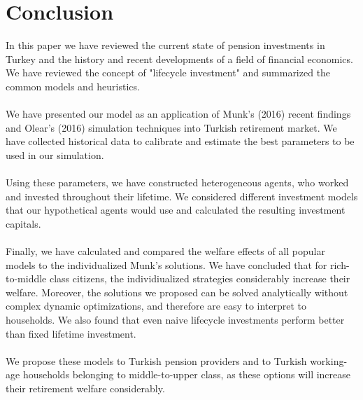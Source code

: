 \documentclass[]{article}
\begin{document}
\begin{table}
\begin{tabular}[c]{lrrrr}
		\hline
	\end{tabular}
\end{table}
\resetgeometry




\section{Conclusion}
\label{conclusion}

In this paper we have reviewed the current state of pension investments in Turkey and the history and recent developments of a field of financial economics. We have reviewed the concept of "lifecycle investment" and summarized the common models and heuristics.

\paragraph{}We have presented our model as an application of Munk's (2016) recent findings and Olear's (2016) simulation techniques into Turkish retirement market. We have collected historical data to calibrate and estimate the best parameters to be used in our simulation.

\paragraph{}Using these parameters, we have constructed heterogeneous agents, who worked and invested throughout their lifetime. We considered different investment models that our hypothetical agents would use and calculated the resulting investment capitals.

\paragraph{}Finally, we have calculated and compared the welfare effects of all popular models to the individualized Munk's solutions. We have concluded that for rich-to-middle class citizens, the individiualized strategies considerably increase their welfare. Moreover, the solutions we proposed can be solved analytically without complex dynamic optimizations, and therefore are easy to interpret to households. We also found that even naive lifecycle investments perform better than fixed lifetime investment.

\paragraph{}We propose these models to Turkish pension providers and to Turkish working-age households belonging to middle-to-upper class, as these options will increase their retirement welfare considerably.
\end{document}
